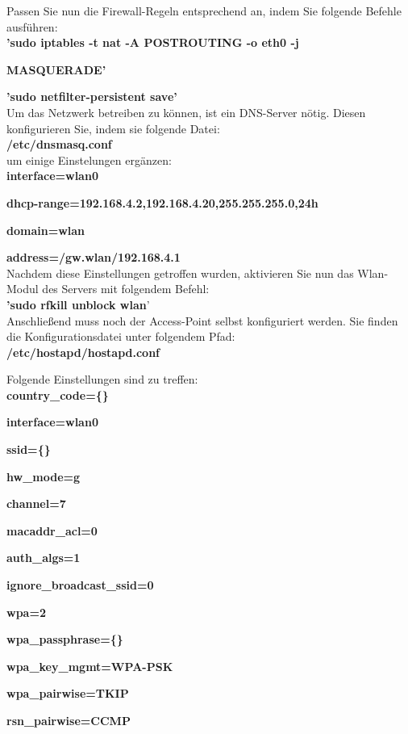 \newpage

\noindent Passen Sie nun die Firewall-Regeln entsprechend an, indem Sie folgende Befehle ausführen:\\

\textbf{’sudo iptables -t nat -A POSTROUTING -o eth0 -j}\par \textbf{MASQUERADE’}\par
\textbf{’sudo netfilter-persistent save’}\\

\noindent Um das Netzwerk betreiben zu können, ist ein DNS-Server nötig. Diesen konfigurieren Sie, indem sie folgende Datei:\\

\textbf{/etc/dnsmasq.conf}\\

\noindent um einige Einstelungen ergänzen:\\

\textbf{interface=wlan0}\par
\textbf{dhcp-range=192.168.4.2,192.168.4.20,255.255.255.0,24h}\par
\textbf{domain=wlan}\par
\textbf{address=/gw.wlan/192.168.4.1}\\

\noindent Nachdem diese Einstellungen getroffen wurden, aktivieren Sie nun das Wlan-Modul des Servers mit folgendem Befehl:\\

\textbf{’sudo rfkill unblock wlan}’\\

\noindent Anschließend muss noch der Access-Point selbst konfiguriert werden. Sie finden die Konfigurationsdatei unter folgendem Pfad:\\

\textbf{/etc/hostapd/hostapd.conf}

\noindent Folgende Einstellungen sind zu treffen:\\

\textbf{country\_code=\{\}}\par
\textbf{interface=wlan0}\par
\textbf{ssid=\{\}}\par
\textbf{hw\_mode=g}\par
\textbf{channel=7}\par
\textbf{macaddr\_acl=0}\par
\textbf{auth\_algs=1}\par
\textbf{ignore\_broadcast\_ssid=0}\par
\textbf{wpa=2}\par
\textbf{wpa\_passphrase=\{\}}\par
\textbf{wpa\_key\_mgmt=WPA-PSK}\par
\textbf{wpa\_pairwise=TKIP}\par
\textbf{rsn\_pairwise=CCMP}\\

